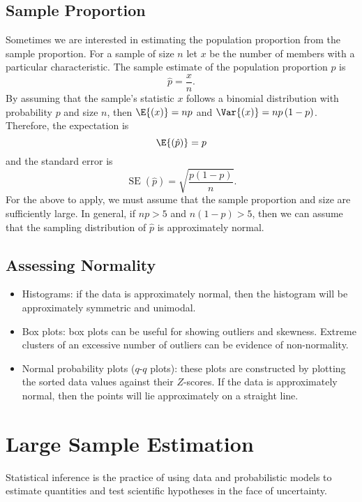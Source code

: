 \documentclass{article}
\begin{document}
\subsection{Sample Proportion}
Sometimes we are interested in estimating the population proportion
from the sample proportion. For a sample of size \(n\) let \(x\) be the
number of members with a particular characteristic. The sample estimate
of the population proportion \(p\) is
\begin{equation*}
    \hat{p} = \frac{x}{n}.
\end{equation*}
By assuming that the sample's statistic \(x\) follows a binomial
distribution with probability \(p\) and size \(n\), then
\(\E{\left( x \right)} = np\) and \(\Var{\left( x \right)} = np\left( 1 - p \right)\).
Therefore, the expectation is
\begin{equation*}
    \E{\left( \hat{p} \right)} = p
\end{equation*}
and the standard error is
\begin{equation*}
    \operatorname{SE}{\left( \hat{p} \right)} = \sqrt{\frac{p\left( 1 - p \right)}{n}}.
\end{equation*}
For the above to apply, we must assume that the sample proportion and
size are sufficiently large. In general, if \(np > 5\) and
\(n\left( 1 - p \right) > 5\), then we can assume that the sampling
distribution of \(\hat{p}\) is approximately normal.
\subsection{Assessing Normality}
\begin{itemize}
    \item Histograms: if the data is approximately normal, then the
          histogram will be approximately symmetric and unimodal.
    \item Box plots: box plots can be useful for showing outliers and
          skewness. Extreme clusters of an excessive number of outliers
          can be evidence of non-normality.
    \item Normal probability plots (\(q\)-\(q\) plots): these plots are
          constructed by plotting the sorted data values against their
          \(Z\)-scores. If the data is approximately normal, then the
          points will lie approximately on a straight line.
\end{itemize}
\section{Large Sample Estimation}
Statistical inference is the practice of using data and probabilistic
models to estimate quantities and test scientific hypotheses in the
face of uncertainty.
\end{document}
